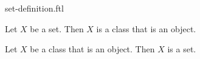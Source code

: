 \documentclass{stex}
\begin{document}
\begin{smodule}{set-definition.ftl}
  \begin{forthel}
    \begin{lemma}
      Let $X$ be a set.
      Then $X$ is a class that is an object.
    \end{lemma}
  \end{forthel}
  \begin{forthel}
    \begin{lemma}
      Let $X$ be a class that is an object.
      Then $X$ is a set.
    \end{lemma}
  \end{forthel}
\end{smodule}
\end{document}
